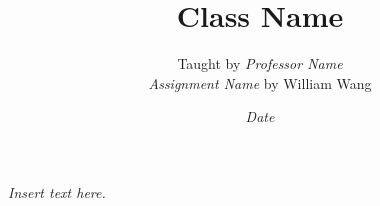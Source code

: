 \documentclass[a4paper]{article}
\title{\textbf{Class Name}}
\author{\large Taught by \textit{Professor Name}\\
\textit{Assignment Name} by William Wang}
\date{\textit{Date}}
\newcommand{\<}{\langle}
\renewcommand{\>}{\rangle}
\renewcommand{\^}{\wedge}
\begin{document}
\maketitle
\newpage
\textit{Insert text here.}
\end{document}
